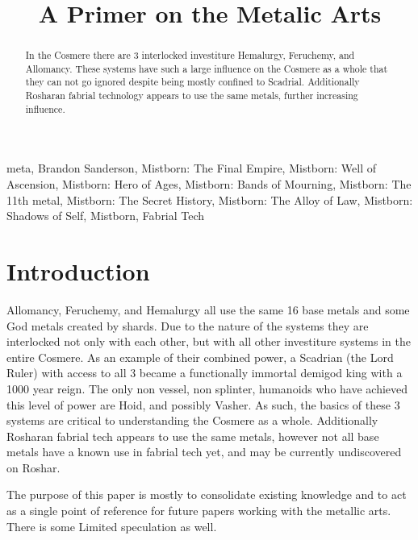 \documentclass[conference]{IEEEtran}
\begin{document}
\title{A Primer on the Metalic Arts}

\author{
}

\maketitle

\begin{abstract}
In the Cosmere there are 3 interlocked investiture Hemalurgy, Feruchemy, and Allomancy.  These systems have such a large influence on the Cosmere as a whole that they can not go ignored despite being mostly confined to Scadrial.  Additionally Rosharan fabrial technology appears to use the same metals, further increasing influence.
\end{abstract}

\begin{IEEEkeywords}
meta, Brandon Sanderson, Mistborn: The Final Empire, Mistborn: Well of Ascension, Mistborn: Hero of Ages, Mistborn: Bands of Mourning, Mistborn: The 11th metal, Mistborn: The Secret History, Mistborn: The Alloy of Law, Mistborn: Shadows of Self, Mistborn, Fabrial Tech
\end{IEEEkeywords}

\section*{Introduction}
Allomancy, Feruchemy, and Hemalurgy all use the same 16 base metals and some God metals created by shards\cite{ARS}. Due to the nature of the systems they are interlocked not only with each other, but with all other investiture systems in the entire Cosmere.  As an example of their combined power, a Scadrian (the Lord Ruler) with access to all 3 became a functionally immortal demigod king with a 1000 year reign\cite{TFE}.  The only non vessel, non splinter, humanoids who have achieved this level of power are Hoid, and possibly Vasher.  As such, the basics of these 3 systems are critical to understanding the Cosmere as a whole.  Additionally Rosharan fabrial tech appears to use the same metals\cite{RoW-CH46}, however not all base metals have a known use in fabrial tech yet, and may be currently undiscovered on Roshar. 

The purpose of this paper is mostly to consolidate existing knowledge and to act as a single point of reference for future papers working with the metallic arts.  There is some Limited speculation as well.
\end{document}
